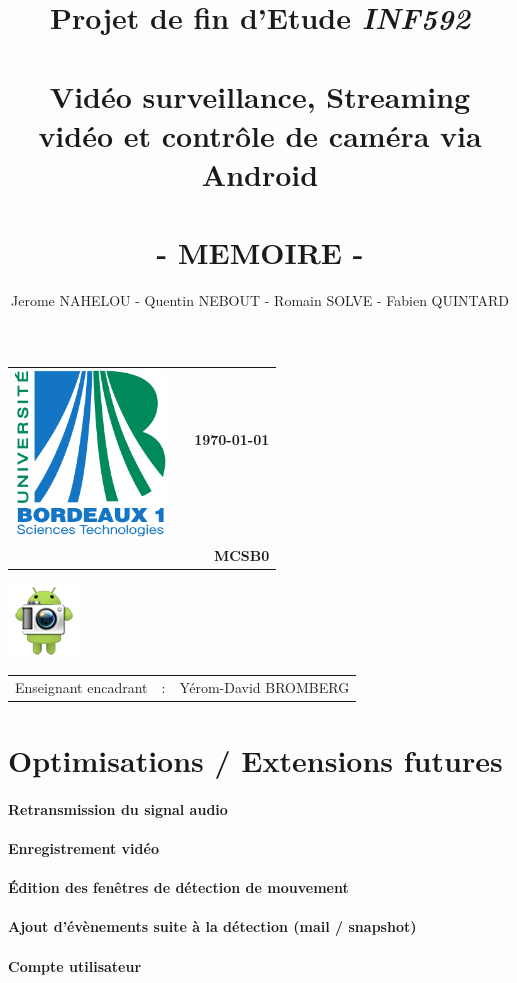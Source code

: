 \documentclass[a4paper,10pt]{report}
\title{\bf Projet de fin d'Etude \Large\textit{INF592} \\~\\ \Huge
 Vidéo surveillance, Streaming vidéo et contrôle de caméra via
Android \\~\\
  \Large - MEMOIRE -}
\author{Jerome NAHELOU - Quentin NEBOUT - Romain SOLVE - Fabien
  QUINTARD}
\date{}
\begin{document}
\begin{titlepage}
  \begin{tabularx}{\linewidth}{lXr}
    \multirow{2}{*}{\includegraphics[width=4cm]{logo-bdx1.pdf}} & &
    \bf\Large\today\\ & & \\
    & & \bf MCSB0\\
  \end{tabularx}
  \vfill
  \begin{minipage}[t]{\linewidth}
    \maketitle
    \center\includegraphics[scale=0.8]{camera.png}
  \end{minipage}
    \vfill
  \begin{tabular}{ r c l }
     \Large{Enseignant encadrant} &  \Large{:} &  \Large{Yérom-David BROMBERG}\\
  \end{tabular}

  \setcounter{page}{0}
  \thispagestyle{empty}

\end{titlepage}






\tableofcontents \clearpage
\clearpage
\clearpage
\clearpage
\clearpage
\clearpage
\clearpage
\clearpage
\clearpage


\chapter{Optimisations / Extensions futures}
\subsubsection{Retransmission du signal audio}
\subsubsection{Enregistrement vidéo}
\subsubsection{Édition des fenêtres de détection  de mouvement}
\subsubsection{Ajout d'évènements suite à la détection (mail / snapshot)}
\subsubsection{Compte utilisateur}
\end{document}
